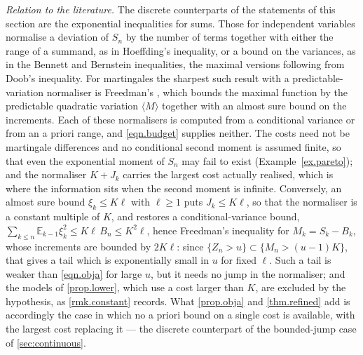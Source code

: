 \documentclass[12pt,oneside,reqno,fleqn]{amsart}
\numberwithin{equation}{section}
\theoremstyle{remark}
\newcommand\mE{{\mathbb E}}
\newcommand\E{\mE}
\newcommand{\1}{{\mathbf 1}}
\renewcommand{\le}{\leq}
\renewcommand{\ge}{\geq}
\begin{document}
	\medskip
	\noindent\textit{Relation to the literature.} The discrete counterparts of the statements of this section are the exponential inequalities for sums. Those for independent variables normalise a deviation of $S_n$ by the number of terms together with either the range of a summand, as in Hoeffding's inequality, or a bound on the variances, as in the Bennett and Bernstein inequalities, the maximal versions following from Doob's inequality. For martingales the sharpest such result with a predictable-variation normaliser is Freedman's \cite{Fre75}, which bounds the maximal function by the predictable quadratic variation $\langle M\rangle$ together with an almost sure bound on the increments. Each of these normalisers is computed from a conditional variance or from an a priori range, and \eqref{eqn.budget} supplies neither. The costs need not be martingale differences and no conditional second moment is assumed finite, so that even the exponential moment of $S_n$ may fail to exist (Example~\ref{ex.pareto}); and the normaliser $K+J_k$ carries the largest cost actually realised, which is where the information sits when the second moment is infinite. Conversely, an almost sure bound $\xi_k\le K\ell$ with $\ell\ge1$ puts $J_k\le K\ell$, so that the normaliser is a constant multiple of $K$, and restores a conditional-variance bound, $\sum_{k\le n}\E_{k-1}\xi_k^2\le K\ell\,B_n\le K^2\ell$, hence Freedman's inequality for $M_k=S_k-B_k$, whose increments are bounded by $2K\ell$: since $\{Z_n>u\}\subset\{M_n>(u-1)K\}$, that gives a tail which is exponentially small in $u$ for fixed $\ell$. Such a tail is weaker than \eqref{eqn.obja} for large $u$, but it needs no jump in the normaliser; and the models of \cref{prop.lower}, which use a cost larger than $K$, are excluded by the hypothesis, as \cref{rmk.constant} records. What \cref{prop.obja} and \cref{thm.refined} add is accordingly the case in which no a priori bound on a single cost is available, with the largest cost replacing it --- the discrete counterpart of the bounded-jump case of \cref{sec:continuous}.
\end{document}
